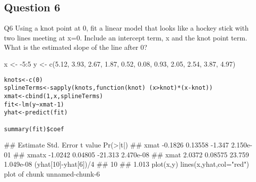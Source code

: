 \documentclass[french]{article}
\begin{document}
	\newpage
	\subsection*{Question 6}
	

Q6
Using a knot point at 0, 
fit a linear model that looks like a hockey stick with two lines meeting at x=0. 
Include an intercept term, x and the knot point term. 
What is the estimated slope of the line after 0?

x <- -5:5
y <- c(5.12, 3.93, 2.67, 1.87, 0.52, 0.08, 0.93, 2.05, 2.54, 3.87, 4.97)

	\begin{framed}
		\begin{verbatim}
knots<-c(0)
splineTerms<-sapply(knots,function(knot) (x>knot)*(x-knot))
xmat<-cbind(1,x,splineTerms)
fit<-lm(y~xmat-1)
yhat<-predict(fit)

summary(fit)$coef
	\end{verbatim}
	\end{framed}
##       Estimate Std. Error t value  Pr(>|t|)
## xmat   -0.1826    0.13558  -1.347 2.150e-01
## xmatx  -1.0242    0.04805 -21.313 2.470e-08
## xmat    2.0372    0.08575  23.759 1.049e-08
(yhat[10]-yhat[6])/4
##    10 
## 1.013
plot(x,y)
lines(x,yhat,col="red")
plot of chunk unnamed-chunk-6
\end{document}

